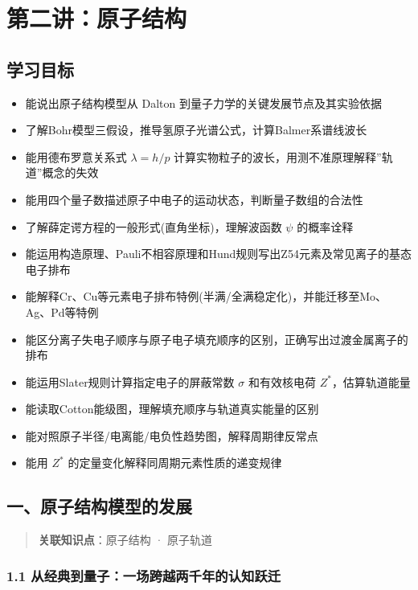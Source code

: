 \section{第二讲：原子结构}\label{ux7b2cux4e8cux8bb2ux539fux5b50ux7ed3ux6784}

\subsection{学习目标}\label{ux5b66ux4e60ux76eeux6807}

\begin{itemize}
\tightlist
\item
  能说出原子结构模型从 Dalton 到量子力学的关键发展节点及其实验依据
\item
  了解Bohr模型三假设，推导氢原子光谱公式，计算Balmer系谱线波长
\item
  能用德布罗意关系式 \(\lambda = h/p\) 计算实物粒子的波长，用测不准原理解释''轨道''概念的失效
\item
  能用四个量子数描述原子中电子的运动状态，判断量子数组的合法性
\item
  了解薛定谔方程的一般形式(直角坐标)，理解波函数 \(\psi\) 的概率诠释
\item
  能运用构造原理、Pauli不相容原理和Hund规则写出Z54元素及常见离子的基态电子排布
\item
  能解释Cr、Cu等元素电子排布特例(半满/全满稳定化)，并能迁移至Mo、Ag、Pd等特例
\item
  能区分离子失电子顺序与原子电子填充顺序的区别，正确写出过渡金属离子的排布
\item
  能运用Slater规则计算指定电子的屏蔽常数 \(\sigma\) 和有效核电荷 \(Z^*\)，估算轨道能量
\item
  能读取Cotton能级图，理解填充顺序与轨道真实能量的区别
\item
  能对照原子半径/电离能/电负性趋势图，解释周期律反常点
\item
  能用 \(Z^*\) 的定量变化解释同周期元素性质的递变规律
\end{itemize}

\subsection{一、原子结构模型的发展}\label{ux4e00ux539fux5b50ux7ed3ux6784ux6a21ux578bux7684ux53d1ux5c55}

\begin{quote}
\textbf{关联知识点}：原子结构 · 原子轨道
\end{quote}

\subsubsection{1.1 从经典到量子：一场跨越两千年的认知跃迁}\label{ux4eceux7ecfux5178ux5230ux91cfux5b50ux4e00ux573aux8de8ux8d8aux4e24ux5343ux5e74ux7684ux8ba4ux77e5ux8dc3ux8fc1}

